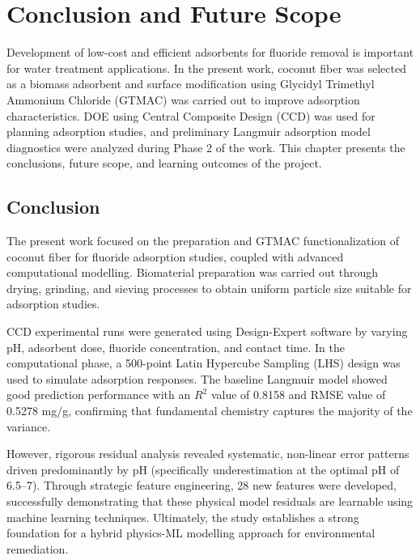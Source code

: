 \chapter{Conclusion and Future Scope}
Development of low-cost and efficient adsorbents for fluoride removal is important for water treatment applications. In the present work, coconut fiber was selected as a biomass adsorbent and surface modification using Glycidyl Trimethyl Ammonium Chloride (GTMAC) was carried out to improve adsorption characteristics. DOE using Central Composite Design (CCD) was used for planning adsorption studies, and preliminary Langmuir adsorption model diagnostics were analyzed during Phase 2 of the work. This chapter presents the conclusions, future scope, and learning outcomes of the project. 

\section{Conclusion}
The present work focused on the preparation and GTMAC functionalization of coconut fiber for fluoride adsorption studies, coupled with advanced computational modelling. Biomaterial preparation was carried out through drying, grinding, and sieving processes to obtain uniform particle size suitable for adsorption studies. 

CCD experimental runs were generated using Design-Expert software by varying pH, adsorbent dose, fluoride concentration, and contact time. In the computational phase, a 500-point Latin Hypercube Sampling (LHS) design was used to simulate adsorption responses. The baseline Langmuir model showed good prediction performance with an $R^2$ value of 0.8158 and RMSE value of 0.5278 mg/g, confirming that fundamental chemistry captures the majority of the variance. 

However, rigorous residual analysis revealed systematic, non-linear error patterns driven predominantly by pH (specifically underestimation at the optimal pH of 6.5--7). Through strategic feature engineering, 28 new features were developed, successfully demonstrating that these physical model residuals are learnable using machine learning techniques. Ultimately, the study establishes a strong foundation for a hybrid physics-ML modelling approach for environmental remediation.

